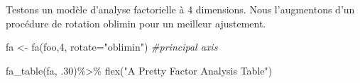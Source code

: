 \documentclass[
]{book}
\newenvironment{Shaded}{\begin{snugshade}}{\end{snugshade}}
\newcommand{\AttributeTok}[1]{\textcolor[rgb]{0.77,0.63,0.00}{#1}}
\newcommand{\CommentTok}[1]{\textcolor[rgb]{0.56,0.35,0.01}{\textit{#1}}}
\newcommand{\DecValTok}[1]{\textcolor[rgb]{0.00,0.00,0.81}{#1}}
\newcommand{\FunctionTok}[1]{\textcolor[rgb]{0.00,0.00,0.00}{#1}}
\newcommand{\NormalTok}[1]{#1}
\newcommand{\OtherTok}[1]{\textcolor[rgb]{0.56,0.35,0.01}{#1}}
\newcommand{\SpecialCharTok}[1]{\textcolor[rgb]{0.00,0.00,0.00}{#1}}
\newcommand{\StringTok}[1]{\textcolor[rgb]{0.31,0.60,0.02}{#1}}
\begin{document}
Testons un modèle d'analyse factorielle à 4 dimensions. Nous l'augmentons d'un procédure de rotation oblimin pour un meilleur ajustement.

\begin{Shaded}
\begin{Highlighting}[]
\NormalTok{fa }\OtherTok{\textless{}{-}} \FunctionTok{fa}\NormalTok{(foo,}\DecValTok{4}\NormalTok{, }\AttributeTok{rotate=}\StringTok{"oblimin"}\NormalTok{)  }\CommentTok{\#principal axis }

\FunctionTok{fa\_table}\NormalTok{(fa, .}\DecValTok{30}\NormalTok{)}\SpecialCharTok{\%\textgreater{}\%}
  \FunctionTok{flex}\NormalTok{(}\StringTok{"A Pretty Factor Analysis Table"}\NormalTok{)}
\end{Highlighting}
\end{Shaded}

\providecommand{\docline}[3]{\noalign{\global\setlength{\arrayrulewidth}{#1}}\arrayrulecolor[HTML]{#2}\cline{#3}}

\setlength{\tabcolsep}{2pt}

\renewcommand*{\arraystretch}{1.5}
\end{document}
